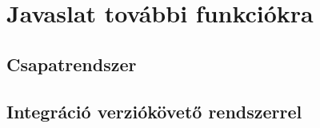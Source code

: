 \chapter{Javaslat további funkciókra}

\section{Csapatrendszer}

\section{Integráció verziókövető rendszerrel}
